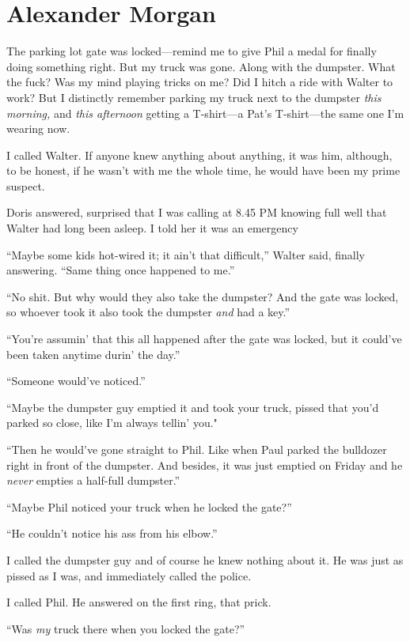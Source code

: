 \chapter{Alexander Morgan}

\titlemark

The parking lot gate was locked---remind me to give Phil a medal for
finally doing something right. But my truck was gone. Along with the
dumpster. What the fuck? Was my mind playing tricks on me? Did I hitch a
ride with Walter to work? But I distinctly remember parking my truck
next to the dumpster \emph{this morning,} and \emph{this afternoon}
getting a T-shirt---a Pat's T-shirt---the same one I'm wearing now.

I called Walter. If anyone knew anything about anything, it was him,
although, to be honest, if he wasn't with me the whole time, he would
have been my prime suspect.

Doris answered, surprised that I was calling at 8.45 PM knowing full
well that Walter had long been asleep. I told her it was an emergency

``Maybe some kids hot-wired it; it ain't that difficult,'' Walter said,
finally answering. ``Same thing once happened to me.''

``No shit. But why would they also take the dumpster? And the gate was
locked, so whoever took it also took the dumpster \emph{and} had a
key.''

``You're assumin' that this all happened after the gate was locked, but
it could've been taken anytime durin' the day.''

``Someone would've noticed.''

``Maybe the dumpster guy emptied it and took your truck, pissed that
you'd parked so close, like I'm always tellin' you."

``Then he would've gone straight to Phil. Like when Paul parked the
bulldozer right in front of the dumpster. And besides, it was just
emptied on Friday and he \emph{never} empties a half-full dumpster.''

``Maybe Phil noticed your truck when he locked the gate?''

``He couldn't notice his ass from his elbow.''

I called the dumpster guy and of course he knew nothing about it. He was
just as pissed as I was, and immediately called the police.

I called Phil. He answered on the first ring, that prick.

``Was \emph{my} truck there when you locked the gate?''

